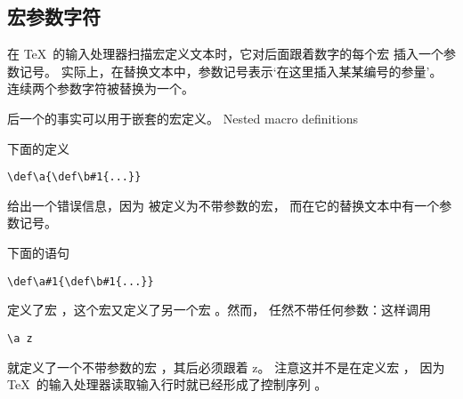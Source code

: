 \documentclass[letterpaper]{book}
\begin{document}
\subsection{宏参数字符}

在 \TeX\ 的输入处理器扫描宏定义文本时，它对后面跟着数字的每个宏%
插入一个参数记号。
实际上，在替换文本中，参数记号表示`在这里插入某某编号的参量'。
连续两个参数字符被替换为一个。

后一个的事实可以用于嵌套的宏定义。
\label{nest:def}\howto Nested macro definitions\par
下面的定义
\begin{verbatim}
\def\a{\def\b#1{...}}
\end{verbatim}
给出一个错误信息，因为  被定义为不带参数的宏，
而在它的替换文本中有一个参数记号。

下面的语句
\begin{verbatim}
\def\a#1{\def\b#1{...}}
\end{verbatim}
定义了宏 ，这个宏又定义了另一个宏 。然而，
 任然不带任何参数：这样调用
\begin{verbatim}
\a z
\end{verbatim}
就定义了一个不带参数的宏 ，其后必须跟着 \n z。
注意这并不是在定义宏 ，
因为 \TeX\ 的输入处理器读取输入行时就已经形成了控制序列 。
\end{document}
